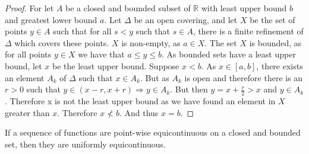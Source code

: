 \documentclass[crop=false,class=book]{standalone}
\begin{document}
\begin{proof}
For let $A$ be a closed and bounded subset of $\mathbb{R}$ with least upper bound $b$ and greatest lower bound $a$. Let $\Delta$ be an open covering, and let $X$ be the set of points $y\in A$ such that for all $s<y$ such that $s\in A$, there is a finite refinement of $\Delta$ which covers these points. $X$ is non-empty, as $a\in X$. The set $X$ is bounded, as for all points $y\in X$ we have that $a\leq y \leq b$. As bounded sets have a least upper bound, let $x$ be the least upper bound. Suppose $x<b$. As $x\in [a,b]$, there exists an element $A_k$ of $\Delta$ such that $x \in A_k$. But as $A_k$ is open and therefore there is an $r>0$ such that $y\in (x-r,x+r)\Rightarrow y \in A_k$. But then $y=x + \frac{r}{2} > x$ and $y\in A_k$. Therefore x is not the least upper bound as we have found an element in $X$ greater than $x$. Therefore $x\not<b$. And thus $x=b$.
\end{proof}
\begin{theorem}
If a sequence of functions are point-wise equicontinuous on a closed and bounded set, then they are uniformly equicontinuous.
\end{theorem}
\end{document}
